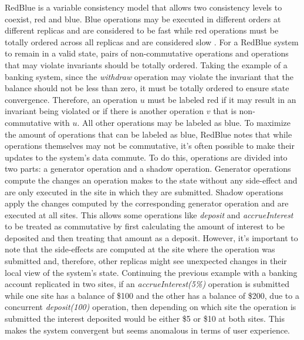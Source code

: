 \documentclass[runningheads,a4paper]{llncs}
\begin{document}
RedBlue is a variable consistency model that allows two consistency levels to coexist, red and blue. Blue operations may be executed in different orders at different replicas and are considered to be fast while red operations must be totally ordered across all replicas and are considered slow \cite{Li2012}. For a RedBlue system to remain in a valid state, pairs of non-commutative operations and operations that may violate invariants should be totally ordered. Taking the example of a banking system, since the \textit{withdraw} operation may violate the invariant that the balance should not be less than zero, it must be totally ordered to ensure state convergence. Therefore, an operation $u$ must be labeled red if it may result in an invariant being violated or if there is another operation $v$ that is non-commutative with $u$. All other operations may be labeled as blue. To maximize the amount of operations that can be labeled as blue, RedBlue notes that while operations themselves may not be commutative, it's often possible to make their updates to the system's data commute. To do this, operations are divided into two parts: a generator operation and a shadow operation. Generator operations compute the changes an operation makes to the state without any side-effect and are only executed in the site in which they are submitted. Shadow operations apply the changes computed by the corresponding generator operation and are executed at all sites. This allows some operations like \textit{deposit} and \textit{accrueInterest} to be treated as commutative by first calculating the amount of interest to be deposited and then treating that amount as a deposit.  However, it's important to note that the side-effects are computed at the site where the operation was submitted and, therefore, other replicas might see unexpected changes in their local view of the system's state. Continuing the previous example with a banking account replicated in two sites, if an \textit{accrueInterest(5\%)} operation is submitted while one site has a balance of \$100 and the other has a balance of \$200, due to a concurrent \textit{deposit(100)} operation, then depending on which site the operation is submitted the interest deposited would be either \$5 or \$10 at both sites. This makes the system convergent but seems anomalous in terms of user experience.\par
\end{document}
